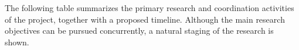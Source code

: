 \def\graycell{\cellcolor[RGB]{200,200,200}}
\def\acell{\cellcolor[rgb]{.98,.81,.69}}
\def\bcell{\cellcolor[rgb]{0.54, 0.81, 0.94}}
\def\ccell{\cellcolor[rgb]{0.98, 0.91, 0.71}}
\def\dcell{\cellcolor[rgb]{0.64, 0.76, 0.68}}
\def\ecell{\cellcolor[rgb]{0.96, 0.76, 0.76}}
\def\g{}
\def\g{\graycell}
\def\a{\acell}
\def\b{\bcell}
\def\c{\ccell}
\def\d{\dcell}
\def\e{\ecell}
\def\yale{\bcell}
\def\brown{\acell}
\def\both{\ecell}


\def\topic#1{\multicolumn{13}{c}{}\\
  \multicolumn{1}{l}{\bf #1 } & \multicolumn{12}{c}{} \\[3pt] \hline}
\def\numb#1{\hbox to 13pt{\hfill \footnotesize #1\hfill}}
\def\ffour{\numb{Q4}}
\def\three{\numb{Q3}}
\def\two{\numb{Q2}}
\def\one{\numb{Q1}}
\def\four{\multicolumn{1}{c|}{\ffour}}


\vskip10pt
\noindent 
The following table summarizes the primary research and coordination
activities of the project, together with a proposed timeline. 
Although the main research objectives 
can be pursued concurrently, a natural staging of the research is shown.

